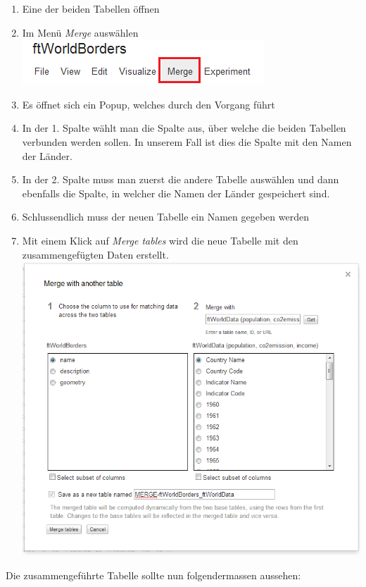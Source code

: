 \begin{enumerate}
\item Eine der beiden Tabellen öffnen
\item Im Menü \emph{Merge} auswählen \\ \includegraphics{images/usecase1-worlddata/worlddata-merge1.png}
\item Es öffnet sich ein Popup, welches durch den Vorgang führt
\item In der 1. Spalte wählt man die Spalte aus, über welche die beiden Tabellen verbunden werden sollen. In unserem Fall ist dies die Spalte mit den Namen der Länder.
\item In der 2. Spalte muss man zuerst die andere Tabelle auswählen und dann ebenfalls die Spalte, in welcher die Namen der Länder gespeichert sind.
\item Schlussendlich muss der neuen Tabelle ein Namen gegeben werden
\item Mit einem Klick auf \emph{Merge tables} wird die neue Tabelle mit den zusammengefügten Daten erstellt. \\ \includegraphics[scale=0.8]{images/usecase1-worlddata/worlddata-merge2.png}
\end{enumerate}

Die zusammengeführte Tabelle sollte nun folgendermassen aussehen:

